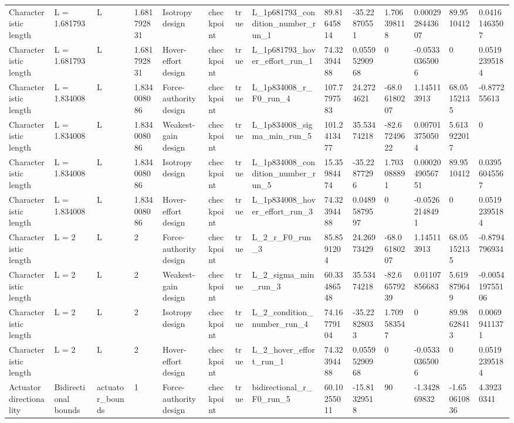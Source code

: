\begin{tabular}{@{}llllllllllllll@{}}
Characteristic length & L = 1.681793 & L & 1.681792831 & Isotropy design & checkpoint & true & L\_1p681793\_condition\_number\_run\_1 & 89.81645814 & -35.22870551 & 1.706398118 & 0.0002928443607 & 89.9510412 & 0.04161463507 \\
Characteristic length & L = 1.681793 & L & 1.681792831 & Hover-effort design & checkpoint & true & L\_1p681793\_hover\_effort\_run\_1 & 74.32394488 & 0.05595290968 & 0 & -0.05330365006 & 0 & 0.05192395184 \\
Characteristic length & L = 1.834008 & L & 1.834008086 & Force-authority design & checkpoint & true & L\_1p834008\_r\_F0\_run\_4 & 107.7797583 & 24.2724621 & -68.06180207 & 1.145113913 & 68.05152135 & -0.877255613 \\
Characteristic length & L = 1.834008 & L & 1.834008086 & Weakest-gain design & checkpoint & true & L\_1p834008\_sigma\_min\_run\_5 & 101.2413477 & 35.53474218 & -82.67249622 & 0.007013750504 & 5.613922017 & 0 \\
Characteristic length & L = 1.834008 & L & 1.834008086 & Isotropy design & checkpoint & true & L\_1p834008\_condition\_number\_run\_5 & 15.35984474 & -35.22877296 & 1.703088891 & 0.0002049056751 & 89.9510412 & 0.03956045567 \\
Characteristic length & L = 1.834008 & L & 1.834008086 & Hover-effort design & checkpoint & true & L\_1p834008\_hover\_effort\_run\_3 & 74.32394488 & 0.04895879597 & 0 & -0.05262148491 & 0 & 0.05192395184 \\
Characteristic length & L = 2 & L & 2 & Force-authority design & checkpoint & true & L\_2\_r\_F0\_run\_3 & 85.8591204 & 24.26973429 & -68.06180207 & 1.145113913 & 68.05152135 & -0.8794796934 \\
Characteristic length & L = 2 & L & 2 & Weakest-gain design & checkpoint & true & L\_2\_sigma\_min\_run\_3 & 60.33486548 & 35.53474218 & -82.66579239 & 0.01107856683 & 5.619879649 & -0.005419755106 \\
Characteristic length & L = 2 & L & 2 & Isotropy design & checkpoint & true & L\_2\_condition\_number\_run\_4 & 74.16779104 & -35.22828033 & 1.709583547 & 0 & 89.98628413 & 0.00699411371 \\
Characteristic length & L = 2 & L & 2 & Hover-effort design & checkpoint & true & L\_2\_hover\_effort\_run\_1 & 74.32394488 & 0.05595290968 & 0 & -0.05330365006 & 0 & 0.05192395184 \\
Actuator directionality & Bidirectional bounds & actuator\_bounds & 1 & Force-authority design & checkpoint & true & bidirectional\_r\_F0\_run\_5 & 60.10255011 & -15.81329518 & 90 & -1.342869832 & -1.650610836 & 4.39230341 \\

\end{tabular}

